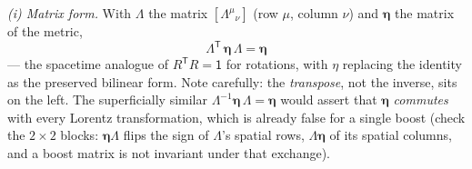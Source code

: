 \documentclass[11pt]{article}
\theoremstyle{plain}
\theoremstyle{definition}
\theoremstyle{remark}
\begin{document}
\emph{(i) Matrix form.} With $\mathsf\Lambda$ the matrix
$[\Lambda^\mu{}_\nu]$ (row $\mu$, column $\nu$) and $\boldsymbol\eta$
the matrix of the metric,
\begin{equation}
  \boxed{\;
  \mathsf\Lambda^{\mathsf T}\,
  \boldsymbol\eta\,
  \mathsf\Lambda
  = \boldsymbol\eta
  \;}
  \label{eq:lorentz-matrix}
\end{equation}
--- the spacetime analogue of $R^{\mathsf T}R = \mathsf 1$ for
rotations, with $\eta$ replacing the identity as the preserved
bilinear form. Note carefully: the \emph{transpose}, not the inverse,
sits on the left. The superficially similar
$\mathsf\Lambda^{-1}\boldsymbol\eta\,\mathsf\Lambda = \boldsymbol\eta$
would assert that $\boldsymbol\eta$ \emph{commutes} with every
Lorentz transformation, which is already false for a single boost
(check the $2\times2$ blocks: $\boldsymbol\eta\mathsf\Lambda$ flips
the sign of $\mathsf\Lambda$'s spatial rows,
$\mathsf\Lambda\boldsymbol\eta$ of its spatial columns, and a boost
matrix is not invariant under that exchange).
\end{document}
